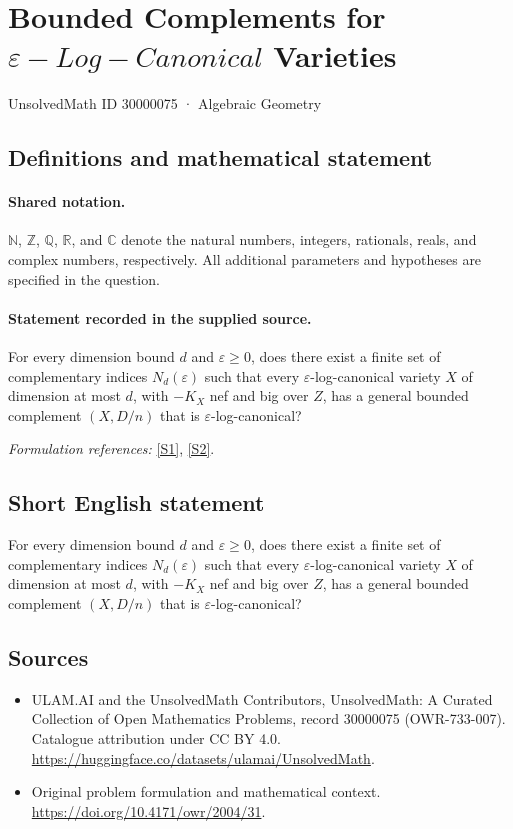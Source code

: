 \documentclass[11pt]{article}
\newcommand{\sref}[2]{\hyperlink{source:#1:#2}{[S#2]}}
\begin{document}
\setcounter{section}{30000074}
\section{\texorpdfstring{Bounded Complements for $\varepsilon-Log-Canonical$ Varieties}{Bounded Complements for varepsilon-Log-Canonical Varieties}}\label{30000075}
{\small UnsolvedMath ID 30000075 · Algebraic Geometry}
\subsection{Definitions and mathematical statement}

\paragraph{Shared notation.}$\mathbb N$, $\mathbb Z$, $\mathbb Q$, $\mathbb R$, and $\mathbb C$ denote the natural numbers, integers, rationals, reals, and complex numbers, respectively. All additional parameters and hypotheses are specified in the question.


\paragraph{Statement recorded in the supplied source.}
For every dimension bound $d$ and $\varepsilon\geq 0$, does there exist a finite set of complementary indices $N_d(\varepsilon)$ such that every $\varepsilon$-log-canonical variety $X$ of dimension at most $d$, with $-K_X$ nef and big over $Z$, has a general bounded complement $(X,D/n)$ that is $\varepsilon$-log-canonical?
\par\smallskip\textit{Formulation references:} \sref{30000075}{1}, \sref{30000075}{2}.
\subsection{Short English statement}
For every dimension bound $d$ and $\varepsilon\geq 0$, does there exist a finite set of complementary indices $N_d(\varepsilon)$ such that every $\varepsilon$-log-canonical variety $X$ of dimension at most $d$, with $-K_X$ nef and big over $Z$, has a general bounded complement $(X,D/n)$ that is $\varepsilon$-log-canonical?
\subsection{Sources}
\begin{itemize}
\item[\hypertarget{source:30000075:1}{S1}] ULAM.AI and the UnsolvedMath Contributors, UnsolvedMath: A Curated Collection of Open Mathematics Problems, record 30000075 (OWR-733-007). Catalogue attribution under CC BY 4.0.
\url{https://huggingface.co/datasets/ulamai/UnsolvedMath}.
\item[\hypertarget{source:30000075:2}{S2}] Original problem formulation and mathematical context.
\url{https://doi.org/10.4171/owr/2004/31}.
\end{itemize}
\label{end:30000075}
\end{document}

